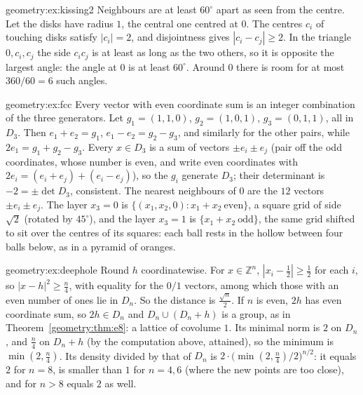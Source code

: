 \begin{solution}{geometry:ex:kissing2}
\idea Neighbours are at least $60^\circ$ apart as seen from the centre.
\writeup Let the disks have radius $1$, the central one centred at $0$. The centres $c_i$ of touching disks satisfy $|c_i|=2$, and disjointness gives
$|c_i-c_j|\ge2$. In the triangle $0,c_i,c_j$ the side $c_ic_j$ is at least as long as the two others, so it is opposite the largest angle: the angle at $0$ is
at least $60^\circ$. Around $0$ there is room for at most $360/60=6$ such angles.
\end{solution}

\begin{solution}{geometry:ex:fcc}
\idea Every vector with even coordinate sum is an integer combination of the three generators.
\writeup Let $g_1=(1,1,0)$, $g_2=(1,0,1)$, $g_3=(0,1,1)$, all in $D_3$. Then $e_1+e_2=g_1$, $e_1-e_2=g_2-g_3$, and similarly for the other pairs, while $2e_1=g_1+g_2-g_3$.
Every $x\in D_3$ is a sum of vectors $\pm e_i\pm e_j$ (pair off the odd coordinates, whose number is even, and write even coordinates with $2e_i=(e_i+e_j)+(e_i-e_j)$),
so the $g_i$ generate $D_3$; their determinant is $-2=\pm\det D_3$, consistent. The nearest neighbours of $0$ are the $12$ vectors $\pm e_i\pm e_j$. The layer $x_3=0$
is $\{(x_1,x_2,0):x_1+x_2\ \text{even}\}$, a square grid of side $\sqrt2$ (rotated by $45^\circ$), and the layer $x_3=1$ is $\{x_1+x_2\ \text{odd}\}$, the same grid
shifted to sit over the centres of its squares: each ball rests in the hollow between four balls below, as in a pyramid of oranges.
\end{solution}

\begin{solution}{geometry:ex:deephole}
\idea Round $h$ coordinatewise.
\writeup For $x\in\mathbb Z^n$, $|x_i-\frac12|\ge\frac12$ for each $i$, so $|x-h|^2\ge\frac n4$, with equality for the $0/1$ vectors, among which those with an even
number of ones lie in $D_n$. So the distance is $\frac{\sqrt n}2$. If $n$ is even, $2h$ has even coordinate sum, so $2h\in D_n$ and $D_n\cup(D_n+h)$ is a group,
as in Theorem~\ref{geometry:thm:e8}: a lattice of covolume $1$. Its minimal norm is $2$ on $D_n$, and $\frac n4$ on $D_n+h$ (by the computation above, attained), so the
minimum is $\min(2,\frac n4)$. Its density divided by that of $D_n$ is $2\cdot\bigl(\min(2,\frac n4)/2\bigr)^{n/2}$: it equals $2$ for $n=8$, is smaller than $1$ for
$n=4,6$ (where the new points are too close), and for $n>8$ equals $2$ as well.
\end{solution}

